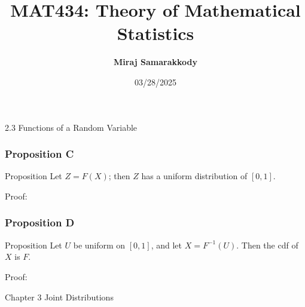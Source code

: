 \documentclass{beamer}
\title{MAT434: Theory of Mathematical Statistics}
\author{\textbf{Miraj Samarakkody}}
\institute{Tougaloo College}
\date{03/28/2025}
\begin{document}
\begin{frame}
    \titlepage
\end{frame}



\begin{frame}{}
    \begin{center}
        \Huge{2.3 Functions of a Random Variable}
    \end{center}

\end{frame}






    


\begin{frame}
    \frametitle{Proposition C}
    \begin{block}{Proposition}
        Let \(Z=F(X)\); then \(Z\) has a uniform distribution of \([0,1]\).
    \end{block}
    \begin{block}{Proof:}
        
    \end{block}


    

\end{frame}

\begin{frame}
    \frametitle{Proposition D}

    \begin{block}{Proposition}
        Let \(U\) be uniform on \([0,1]\), and let \(X = F^{-1}(U)\). Then the cdf of \(X\) is \(F\). 
    \end{block}
    \begin{block}{Proof:}
        
    \end{block}

\end{frame}


\begin{frame}{Chapter 3}
 \Huge{Joint Distributions}
\end{frame}
\end{document}
